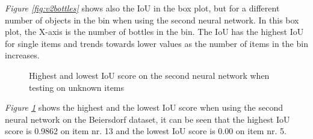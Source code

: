 \textit{Figure \ref{fig:v2bottles}} shows also the IoU in the box plot, but for a different number of objects in the bin when using the second neural network. In this box plot, the X-axis is the number of bottles in the bin. The IoU has the highest IoU for single items and trends towards lower values as the number of items in the bin increases.

\clearpage
\begin{figure}[h]
 \centering
 \hfill
 
 \caption{Highest and lowest IoU score on the second neural network when testing on unknown items}
 \label{fig:v2unknowniou2}
\end{figure}

\textit{Figure \ref{fig:v2unknowniou2}} shows the highest and the lowest IoU score when using the second neural network on the Beiersdorf dataset, it can be seen that the highest IoU score is 0.9862 on item nr. 13 and the lowest IoU score is 0.00 on item nr. 5.

